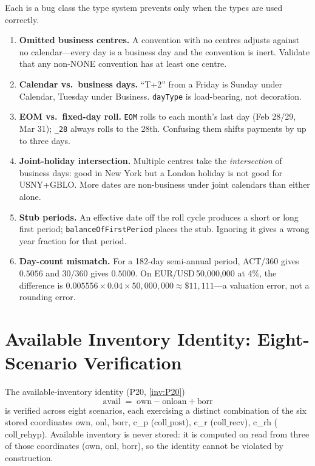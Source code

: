 \documentclass[11pt,a4paper]{article}
\begin{document}
Each is a bug class the type system prevents only when the types are used correctly.
\begin{enumerate}[nosep]
\item \textbf{Omitted business centres.} A convention with no centres adjusts against no calendar---every day is a business day and the convention is inert. Validate that any non-NONE convention has at least one centre.
\item \textbf{Calendar vs.\ business days.} ``T+2'' from a Friday is Sunday under Calendar, Tuesday under Business. \texttt{dayType} is load-bearing, not decoration.
\item \textbf{EOM vs.\ fixed-day roll.} \texttt{EOM} rolls to each month's last day (Feb 28/29, Mar 31); \texttt{\_28} always rolls to the 28th. Confusing them shifts payments by up to three days.
\item \textbf{Joint-holiday intersection.} Multiple centres take the \emph{intersection} of business days: good in New York but a London holiday is not good for USNY+GBLO. More dates are non-business under joint calendars than either alone.
\item \textbf{Stub periods.} An effective date off the roll cycle produces a short or long first period; \texttt{balanceOfFirstPeriod} places the stub. Ignoring it gives a wrong year fraction for that period.
\item \textbf{Day-count mismatch.} For a 182-day semi-annual period, ACT/360 gives $0.5056$ and 30/360 gives $0.5000$. On EUR/USD\,50{,}000{,}000 at 4\%, the difference is $0.005556\times0.04\times50{,}000{,}000\approx\$11{,}111$---a valuation error, not a rounding error.
\end{enumerate}

\section{Available Inventory Identity: Eight-Scenario Verification}
\label{app:avail-identity}

The available-inventory identity (P20, \ref{inv:P20})
\[
  \mathrm{avail} \;=\; \mathrm{own} - \mathrm{onloan} + \mathrm{borr}
\]
is verified across eight scenarios, each exercising a distinct combination of the six stored coordinates own, onl, borr, c\_p ($\mathrm{coll\_post}$), c\_r ($\mathrm{coll\_recv}$), c\_rh ($\mathrm{coll\_rehyp}$). Available inventory is never stored: it is computed on read from three of those coordinates (own, onl, borr), so the identity cannot be violated by construction.
\end{document}
